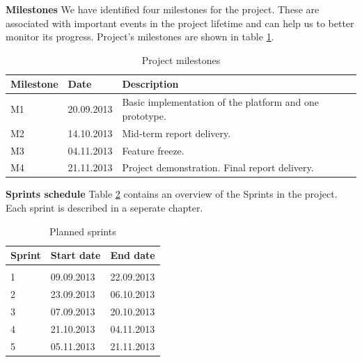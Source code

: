 \textbf{Milestones} \newline
We have identified four milestones for the project. These are associated with important events in the project lifetime and can help us to better monitor its progress. Project's milestones are shown in table \ref{table:milestones}.

\begin{table}[h]
\begin{center}
\begin{tabular}{ | l | l | l | }
  \hline
  Milestone & Date & Description \\
  \hline\noalign{\smallskip}\noalign{\smallskip}\hline
  M1 & 20.09.2013 & Basic implementation of the platform and one prototype. \\ 
  M2 & 14.10.2013 & Mid-term report delivery. \\
  M3 & 04.11.2013 & Feature freeze. \\
  M4 & 21.11.2013 & Project demonstration. Final report delivery. \\
  \hline
\end{tabular}
\end{center}
\caption{Project milestones}
\label{table:milestones}
\end{table}

\textbf{Sprints schedule} \newline
Table \ref{table:sprints} contains an overview of the Sprints in the project.
Each sprint is described in a seperate chapter.

\begin{table}[h]
\begin{center}
\begin{tabular}{ | l | l | l | }
  \hline
  Sprint & Start date & End date \\
  \hline\noalign{\smallskip}\noalign{\smallskip}\hline
  0 &  &  \\ 
  1 & 09.09.2013 & 22.09.2013 \\
  2 & 23.09.2013 & 06.10.2013 \\
  3 & 07.09.2013 & 20.10.2013 \\
  4 & 21.10.2013 & 04.11.2013 \\
  5 & 05.11.2013 & 21.11.2013 \\
  \hline
\end{tabular}
\end{center}
\caption{Planned sprints}
\label{table:sprints}
\end{table}


